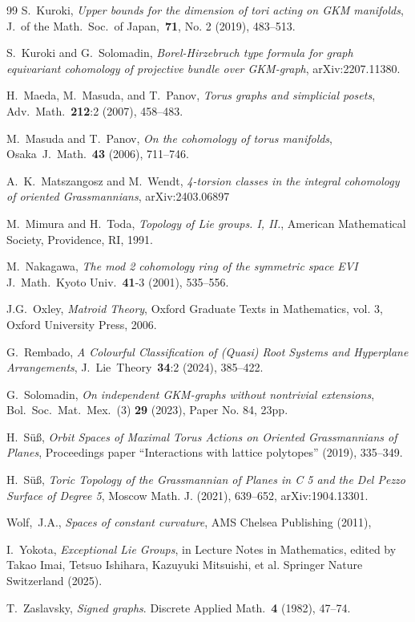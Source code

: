\documentclass{amsart}
\theoremstyle{definition}
\theoremstyle{remark}
\numberwithin{equation}{section}
\begin{document}
\begin{thebibliography}{99}
S.~Kuroki,
\emph{Upper bounds for the dimension of tori acting on GKM manifolds}, 
J.~of the Math.~Soc.~of Japan,~\textbf{71}, No. 2 (2019), 483--513.

S.~Kuroki and G.~Solomadin, 
\emph{Borel-Hirzebruch type formula for graph equivariant cohomology of projective bundle over GKM-graph}, arXiv:2207.11380.

H.~Maeda, M.~Masuda, and T.~Panov, 
\emph{Torus graphs and simplicial posets}, 
Adv.~Math.~\textbf{212}:2 (2007), 458--483.

M.~Masuda and T.~Panov,
\emph{On the cohomology of torus manifolds},
Osaka~J.~Math.~\textbf{43} (2006), 711--746.

A.~K.~Matszangosz and  M.~Wendt, 
\emph{4-torsion classes in the integral cohomology of oriented Grassmannians},
arXiv:2403.06897

M.~Mimura and H.~Toda, 
\emph{Topology of Lie groups. I, II.},
American Mathematical Society, Providence, RI, 1991.

M.~Nakagawa, 
\emph{The mod 2 cohomology ring of the symmetric space EVI}
J.~Math.~Kyoto Univ.~\textbf{41}-3 (2001), 535--556.

J.G.~Oxley,  
\emph{Matroid Theory}, 
Oxford Graduate Texts in Mathematics, vol. 3, 
Oxford University Press, 2006.

G.~Rembado,
\emph{A Colourful Classification of (Quasi) Root Systems and Hyperplane Arrangements},
J.~Lie~Theory~\textbf{34}:2 (2024), 385--422.

G.~Solomadin,
\emph{On independent GKM-graphs without nontrivial extensions},
Bol.~Soc.~Mat.~Mex.~(3) \textbf{29} (2023), Paper No. 84, 23pp.

H.~S\"u{\ss},
\emph{Orbit Spaces of Maximal Torus Actions on Oriented Grassmannians of Planes},
Proceedings paper ``Interactions with lattice polytopes'' (2019), 335--349.

H.~S\"u{\ss},
\emph{Toric Topology of the Grassmannian of Planes in C 5 and the Del Pezzo Surface of Degree 5},
Moscow Math. J. (2021), 639--652, arXiv:1904.13301.

Wolf,~J.A.,
\textit{Spaces of constant curvature}, AMS Chelsea Publishing (2011), 

I.~Yokota, 
\textit{Exceptional Lie Groups}, in Lecture Notes in Mathematics, edited by Takao Imai, Tetsuo Ishihara, Kazuyuki Mitsuishi, et al. Springer Nature Switzerland (2025). %

T.~Zaslavsky, \emph{Signed graphs}. 
Discrete Applied Math.~\textbf{4} (1982),  47--74.

\end{thebibliography}
\end{document}

